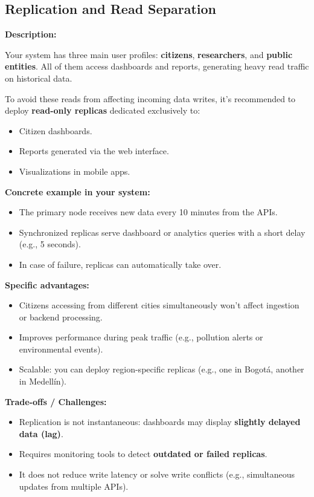 \subsection{Replication and Read Separation}

\textbf{Description:}

Your system has three main user profiles: \textbf{citizens}, \textbf{researchers}, and \textbf{public entities}. All of them access dashboards and reports, generating heavy read traffic on historical data.

To avoid these reads from affecting incoming data writes, it's recommended to deploy \textbf{read-only replicas} dedicated exclusively to:

\begin{itemize}
  \item Citizen dashboards.
  \item Reports generated via the web interface.
  \item Visualizations in mobile apps.
\end{itemize}

\textbf{Concrete example in your system:}

\begin{itemize}
  \item The primary node receives new data every 10 minutes from the APIs.
  \item Synchronized replicas serve dashboard or analytics queries with a short delay (e.g., 5 seconds).
  \item In case of failure, replicas can automatically take over.
\end{itemize}

\textbf{Specific advantages:}
\begin{itemize}
  \item Citizens accessing from different cities simultaneously won't affect ingestion or backend processing.
  \item Improves performance during peak traffic (e.g., pollution alerts or environmental events).
  \item Scalable: you can deploy region-specific replicas (e.g., one in Bogotá, another in Medellín).
\end{itemize}

\textbf{Trade-offs / Challenges:}
\begin{itemize}
  \item Replication is not instantaneous: dashboards may display \textbf{slightly delayed data (lag)}.
  \item Requires monitoring tools to detect \textbf{outdated or failed replicas}.
  \item It does not reduce write latency or solve write conflicts (e.g., simultaneous updates from multiple APIs).
\end{itemize}

